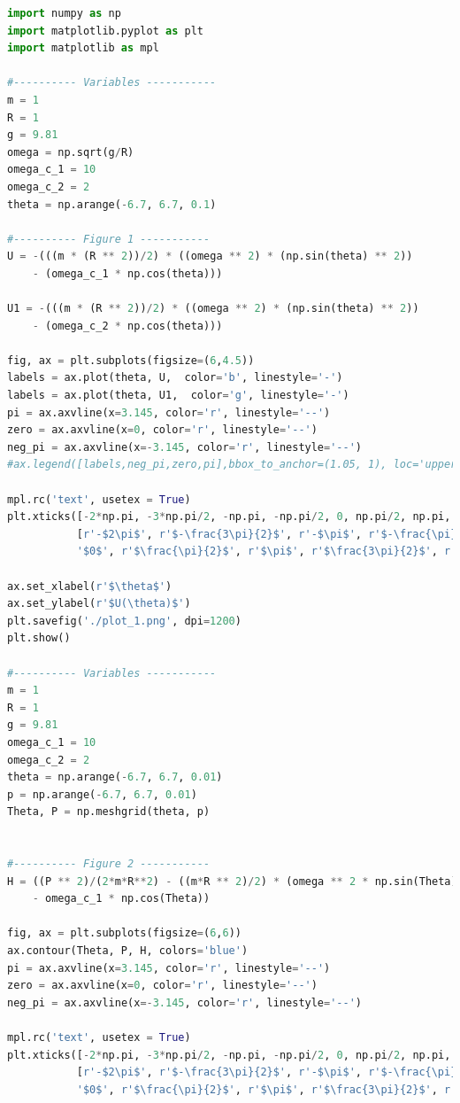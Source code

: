 \documentclass[12pt]{article}
\begin{document}
\begin{lstlisting}[language=Python, caption=Python Graphs]
import numpy as np
import matplotlib.pyplot as plt
import matplotlib as mpl

#---------- Variables -----------
m = 1
R = 1
g = 9.81
omega = np.sqrt(g/R)
omega_c_1 = 10
omega_c_2 = 2
theta = np.arange(-6.7, 6.7, 0.1)

#---------- Figure 1 -----------
U = -(((m * (R ** 2))/2) * ((omega ** 2) * (np.sin(theta) ** 2))
    - (omega_c_1 * np.cos(theta)))

U1 = -(((m * (R ** 2))/2) * ((omega ** 2) * (np.sin(theta) ** 2))
    - (omega_c_2 * np.cos(theta)))

fig, ax = plt.subplots(figsize=(6,4.5))
labels = ax.plot(theta, U,  color='b', linestyle='-')
labels = ax.plot(theta, U1,  color='g', linestyle='-')
pi = ax.axvline(x=3.145, color='r', linestyle='--')
zero = ax.axvline(x=0, color='r', linestyle='--')
neg_pi = ax.axvline(x=-3.145, color='r', linestyle='--')
#ax.legend([labels,neg_pi,zero,pi],bbox_to_anchor=(1.05, 1), loc='upper left', borderaxespad=0.)

mpl.rc('text', usetex = True)
plt.xticks([-2*np.pi, -3*np.pi/2, -np.pi, -np.pi/2, 0, np.pi/2, np.pi, 3*np.pi/2, 2*np.pi],
           [r'-$2\pi$', r'$-\frac{3\pi}{2}$', r'-$\pi$', r'$-\frac{\pi}{2}$', 
           '$0$', r'$\frac{\pi}{2}$', r'$\pi$', r'$\frac{3\pi}{2}$', r'$2\pi$'])

ax.set_xlabel(r'$\theta$')
ax.set_ylabel(r'$U(\theta)$')
plt.savefig('./plot_1.png', dpi=1200)
plt.show()

#---------- Variables -----------
m = 1
R = 1
g = 9.81
omega_c_1 = 10
omega_c_2 = 2
theta = np.arange(-6.7, 6.7, 0.01)
p = np.arange(-6.7, 6.7, 0.01)
Theta, P = np.meshgrid(theta, p)


#---------- Figure 2 -----------
H = ((P ** 2)/(2*m*R**2) - ((m*R ** 2)/2) * (omega ** 2 * np.sin(Theta) ** 2) 
    - omega_c_1 * np.cos(Theta))

fig, ax = plt.subplots(figsize=(6,6))
ax.contour(Theta, P, H, colors='blue')
pi = ax.axvline(x=3.145, color='r', linestyle='--')
zero = ax.axvline(x=0, color='r', linestyle='--')
neg_pi = ax.axvline(x=-3.145, color='r', linestyle='--')

mpl.rc('text', usetex = True)
plt.xticks([-2*np.pi, -3*np.pi/2, -np.pi, -np.pi/2, 0, np.pi/2, np.pi, 3*np.pi/2, 2*np.pi],
           [r'-$2\pi$', r'$-\frac{3\pi}{2}$', r'-$\pi$', r'$-\frac{\pi}{2}$', 
           '$0$', r'$\frac{\pi}{2}$', r'$\pi$', r'$\frac{3\pi}{2}$', r'$2\pi$'])


\end{lstlisting}
\end{document}
